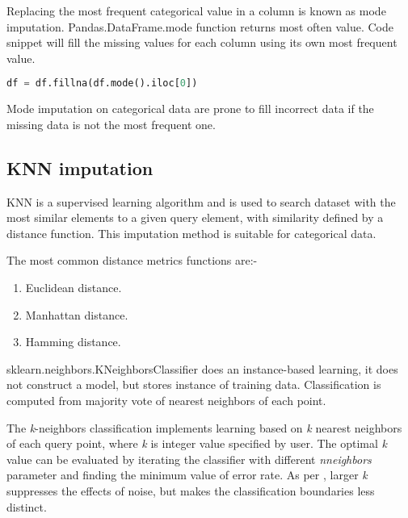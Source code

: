 Replacing the most frequent categorical value in a column is known as mode imputation.  Pandas.DataFrame.mode \parencite{mckinney-proc-scipy-2010} function returns most often value. Code snippet will fill the missing values for each column using its own most frequent value.

\begin{lstlisting}[language=Python, caption={Pandas DataFrames mode function}]
    df = df.fillna(df.mode().iloc[0])
\end{lstlisting}

Mode imputation on categorical data are prone to fill incorrect data if the missing data is not the most frequent one.



\subsection{\acf{KNN}  imputation}

\acl{KNN} is a supervised learning algorithm and is used to search dataset with the most similar elements to a given query element, with similarity defined by a distance function. This imputation method is suitable for categorical data.

The most common distance metrics functions are:-

\begin{enumerate}
    \item Euclidean distance.
    \item Manhattan distance.
    \item Hamming distance.
\end{enumerate}

sklearn.neighbors.KNeighborsClassifier \parencite{scikit-learn} does an instance-based learning, it does not construct a model, but stores instance of training data. Classification is computed from majority vote of nearest neighbors of each point.

The \textit{k}-neighbors classification implements learning based on  \textit{k} nearest neighbors of each query point, where \textit{k} is integer value specified by user. The optimal \textit{k} value can be evaluated by iterating the classifier with different  \textit{n\textunderscore neighbors} parameter and finding the minimum value of error rate. As per \parencite{scikit-learn}, larger \textit{k} suppresses the effects of noise, but makes the classification boundaries less distinct.

